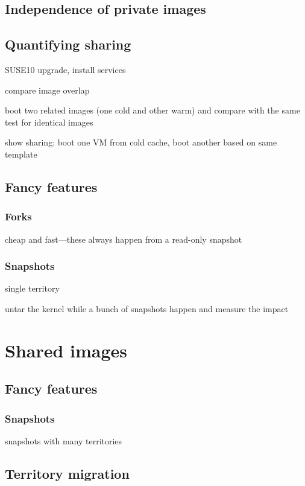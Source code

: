 \subsection{Independence of private images}
\subsection{Quantifying sharing}\label{sec:quantifying-sharing}

SUSE10 upgrade, install services

compare image overlap

boot two related images (one cold and other warm) and compare with the same test for identical images

show sharing: boot one VM from cold cache, boot another based on same template

\subsection{Fancy features}

\subsubsection{Forks}

cheap and fast---these always happen from a read-only snapshot

\subsubsection{Snapshots}

single territory

untar the kernel while a bunch of snapshots happen and measure the impact

\section{Shared images}


\subsection{Fancy features}

\subsubsection{Snapshots}

snapshots with many territories

\subsection{Territory migration}

